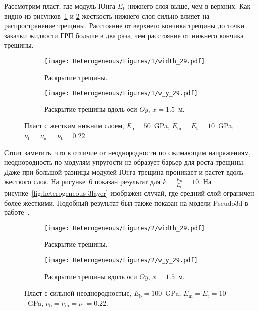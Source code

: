 Рассмотрим пласт, где модуль Юнга $E_\text{b}$ нижнего слоя выше, чем в верхних. Как видно из рисунков~\ref{fig:heterogeneous-2-layer-planar} и \ref{fig:heterogeneous-2-layer-slice} жесткость нижнего слоя сильно влияет на распространение трещины. Расстояние от верхнего кончика трещины до точки закачки жидкости ГРП больше в два раза, чем расстояние от нижнего кончика трещины.
\begin{figure}[htbp]
    \centering
    \begin{subfigure}[t]{0.4\textwidth}
        \centering
        \texttt{[image: Heterogeneous/Figures/1/width\_29.pdf]}
        \caption{Раскрытие трещины.}
        \label{fig:heterogeneous-2-layer-planar}
    \end{subfigure}
    \hfill 
    \begin{subfigure}[t]{0.55\textwidth}
        \centering
        \texttt{[image: Heterogeneous/Figures/1/w\_y\_29.pdf]}
        \caption{Раскрытие трещины вдоль оси $Oy$, $x=1.5$~м.}
        \label{fig:heterogeneous-2-layer-slice}
    \end{subfigure}
    \caption{Пласт с жестким нижним слоем, $E_\text{b} = 50$~GPa, $E_\text{m} = E_\text{t} = 10$~GPa, $\nu_\text{b} = \nu_\text{m} = \nu_\text{t} = 0.22$.}
    \label{fig:heterogeneous-2-layer}
\end{figure}


Стоит заметить, что в отличие от неоднородности по сжимающим напряжениям, неоднородность по модулям упругости не образует барьер для роста трещины. Даже при большой разницы модулей Юнга трещина проникает и растет вдоль жесткого слоя. На рисунке~\ref{fig:heterogeneous-high} показан результат для $k=\frac{E_\text{b}}{E_\text{t}} = 10$. На рисунке~\ref{fig:heterogeneous-3layer} изображен случай, где средний слой ограничен более жесткими. Подобный результат был также показан на модели Pseudo3d в работе~\cite{gu2006}.
\begin{figure}[htbp]
    \centering
    \begin{subfigure}[t]{0.4\textwidth}
        \centering
        \texttt{[image: Heterogeneous/Figures/2/width\_29.pdf]}
        \caption{Раскрытие трещины.}
        \label{fig:heterogeneous-high-planar}
    \end{subfigure}
    \hfill 
    \begin{subfigure}[t]{0.55\textwidth}
        \centering
        \texttt{[image: Heterogeneous/Figures/2/w\_y\_29.pdf]}
        \caption{Раскрытие трещины вдоль оси $Oy$, $x=1.5$~м.}
        \label{fig:heterogeneous-high-slice}
    \end{subfigure}
    \caption{Пласт с сильной неоднородностью, $E_\text{b} = 100$~GPa, $E_\text{m} = E_\text{t} = 10$~GPa, $\nu_\text{b} = \nu_\text{m} = \nu_\text{t} = 0.22$.}
    \label{fig:heterogeneous-high}
\end{figure}


